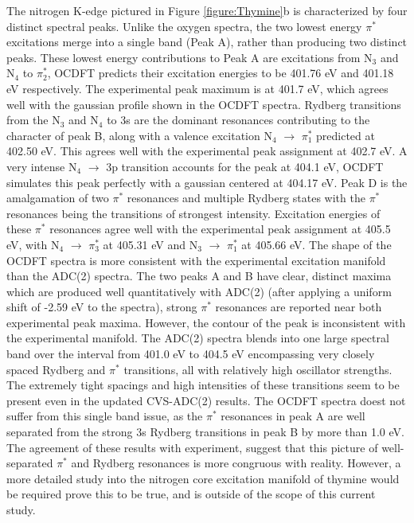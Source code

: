 \documentclass[11.5pt]{article}
\begin{document}
The nitrogen K-edge pictured in Figure \ref{figure:Thymine}b is characterized by four distinct spectral peaks. Unlike the oxygen spectra, the two lowest energy $\pi^*$ excitations merge into a single band (Peak A), rather than producing two distinct peaks. These lowest energy contributions to Peak A are excitations from N$_3$ and N$_4$ to $\pi^*_2$, OCDFT predicts their excitation energies to be 401.76 eV and 401.18 eV respectively. The experimental peak maximum is at 401.7 eV, which agrees well with the gaussian profile shown in the OCDFT spectra. Rydberg transitions from the N$_3$ and N$_4$ to 3s are the dominant resonances contributing to the character of peak B, along with a valence excitation N$_4$ $\rightarrow$ $\pi^*_1$ predicted at 402.50 eV. This agrees well with the experimental peak assignment at 402.7 eV. A very intense N$_4$ $\rightarrow$ 3p transition accounts for the peak at 404.1 eV, OCDFT simulates this peak perfectly with a gaussian centered at 404.17 eV. Peak D is the amalgamation of two $\pi^*$ resonances and multiple Rydberg states with the $\pi^*$ resonances being the transitions of strongest intensity. Excitation energies of these $\pi^*$ resonances agree well with the experimental peak assignment at 405.5 eV, with N$_4$ $\rightarrow$ $\pi^*_3$ at 405.31 eV and N$_3$ $\rightarrow$ $\pi^*_1$ at 405.66 eV. The shape of the OCDFT spectra is more consistent with the experimental excitation manifold than the ADC(2) spectra. The two peaks A and B have clear, distinct maxima which are produced well quantitatively with ADC(2) (after applying a uniform shift of -2.59 eV to the spectra), strong $\pi^*$ resonances are reported near both experimental peak maxima. However, the contour of the peak is inconsistent with the experimental manifold. The ADC(2) spectra blends into one large spectral band over the interval from 401.0 eV to 404.5 eV encompassing very closely spaced Rydberg and $\pi^*$ transitions, all with relatively high oscillator strengths. The extremely tight spacings and high intensities of these transitions seem to be present even in the updated CVS-ADC(2) results. The OCDFT spectra doest not suffer from this single band issue, as the $\pi^*$ resonances in peak A are well separated from the strong 3s Rydberg transitions in peak B by more than 1.0 eV. The agreement of these results with experiment, suggest that this picture of well-separated $\pi^*$ and Rydberg resonances is more congruous with reality. However, a more detailed study into the nitrogen core excitation manifold of thymine would be required prove this to be true, and is outside of the scope of this current study.
\end{document}
